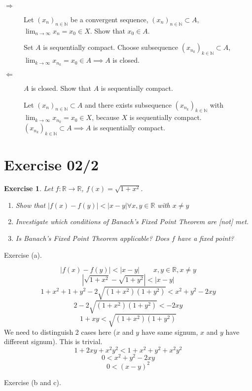 \documentclass{article}
\newtheorem{ex}{Exercise} %
\newcommand{\card}[1]{\left|#1\right|}
\begin{document}
\begin{description}
  \item[$\Rightarrow$]
    Let $(x_n)_{n \in \mathbb N}$ be a convergent sequence, $(x_n)_{n \in \mathbb N} \subset A$, $\lim_{n\to\infty} x_n = x_0 \in X$.
    Show that $x_0 \in A$.

    Set $A$ is sequentially compact. Choose subsequence $(x_{n_k})_{k \in \mathbb N} \subset A$, $\lim_{k\to\infty} x_{n_k} = x_0 \in A \implies A$ is closed.
  \item[$\Leftarrow$]
    $A$ is closed. Show that $A$ is sequentially compact.

    Let $(x_n)_{n\in\mathbb N} \subset A$ and there exists subsequence $(x_{n_k})_{k \in \mathbb N}$ with $\lim_{k\to\infty} x_{n_k} = x_0 \in X$, because $X$ is sequentially compact.
    $(x_{n_k})_{k \in \mathbb N} \subset A \implies A$ is sequentially compact.
\end{description}

\section{Exercise 02/2}

\begin{ex}
  Let $f: \mathbb R \to \mathbb R$, $f(x) = \sqrt{1 + x^2}$.
  \begin{enumerate}
    \item Show that $\card{f(x) - f(y)} < \card{x - y} \forall x, y \in \mathbb R$ with $x \neq y$
    \item Investigate which conditions of Banach's Fixed Point Theorem are [not] met.
    \item Is Banach's Fixed Point Theorem applicable? Does $f$ have a fixed point?
  \end{enumerate}
\end{ex}

Exercise (a).

\[ \card{f(x) - f(y)} < \card{x - y} \qquad x,y \in \mathbb R, x \neq y \]
\[ \card{\sqrt{1 + x^2} - \sqrt{1 + y^2}} < \card{x - y} \]
\[ 1 + x^2 + 1 + y^2 - 2 \sqrt{(1 + x^2) (1 + y^2)} < x^2 + y^2 - 2xy \]
\[ 2 - 2\sqrt{(1 + x^2)(1 + y^2)} < -2xy \]
\[ 1 + xy < \sqrt{(1 + x^2)(1 + y^2)} \]
We need to distinguish 2 cases here ($x$ and $y$ have same signum, $x$ and $y$ have different signum). This is trivial.
\[ 1 + 2xy + x^2 y^2 < 1 + x^2 + y^2 + x^2 y^2 \]
\[ 0 < x^2 + y^2 - 2xy \]
\[ 0 < (x - y)^2 \]

Exercise (b and c).
\end{document}
